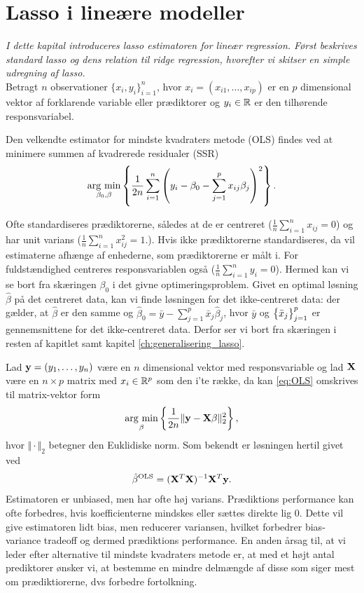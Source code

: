 \chapter{Lasso i lineære modeller}
\textit{I dette kapital introduceres lasso estimatoren for lineær regression. 
Først beskrives standard lasso og dens relation til ridge regression, hvorefter vi skitser en simple udregning af lasso.} \\[4mm]
%
Betragt \(n\) observationer \(\{x_i, y_i\}_{i=1}^n \), hvor $x_i=(x_{i1}, \ldots, x_{ip})$ er en $p$ dimensional vektor af forklarende variable eller prædiktorer og $y_i \in \mathbb{R}$ er den tilhørende responsvariabel.

Den velkendte estimator for mindste kvadraters metode (OLS) findes ved at minimere summen af kvadrerede residualer (SSR)
\begin{align}
\argmin_{\beta_0, \beta} \cbr{\frac{1}{2n} \sum_{i=1}^n \del{y_i - \beta_0 - \sum_{j=1}^p x_{ij} \beta_j}^2}. \label{eq:OLS}
\end{align}

Ofte standardiseres prædiktorerne, således at de er centreret (\(\frac{1}{n} \sum_{i=1}^n x_{ij} = 0\)) og har unit varians (\(\frac{1}{n} \sum_{i=1}^n x_{ij}^2=1\).).
Hvis ikke prædiktorerne standardiseres, da vil estimaterne afhænge af enhederne, som prædiktorerne er målt i.
For fuldstændighed centreres responsvariablen også (\(\frac{1}{n} \sum_{i=1}^n y_{i} = 0\)).
Hermed kan vi se bort fra skæringen $\beta_0$ i det givne optimeringsproblem.
Givet en optimal løsning \(\hat{\beta}\) på det centreret data, kan vi finde løsningen for det ikke-centreret data: der gælder, at \(\hat{\beta}\) er den samme og 
\(\hat{\beta}_0 = \bar{y} - \sum_{j=1}^p \bar{x}_j \hat{\beta}_j\), hvor \(\bar{y}\) og \(\cbr{\bar{x}_j}_{j=1}^p\) er gennemsnittene for det ikke-centreret data.
Derfor ser vi bort fra skæringen i resten af kapitlet samt kapitel \ref{ch:generalisering_lasso}.

Lad \(\mathbf{y}=(y_1, \ldots, y_n)\) være en \(n\) dimensional vektor med responsvariable og lad \(\mathbf{X}\) være en $n \times p$ matrix med $x_i \in \mathbb{R}^p$ som den i'te række, da kan \eqref{eq:OLS} omskrives til matrix-vektor form
\begin{align*}
\argmin_{ \beta} \cbr{\frac{1}{2n} \Vert \y - \X \beta \Vert_2^2},
\end{align*}
hvor \(\Vert \cdot \Vert_2\) betegner den Euklidiske norm.
Som bekendt er løsningen hertil givet ved
\begin{align*}
\hat{\beta}^{\text{OLS}} = (\mathbf{X}^T \mathbf{X})^{-1} \mathbf{X}^T \mathbf{y}.
\end{align*}
Estimatoren er unbiased, men har ofte høj varians. 
Prædiktions performance kan ofte forbedres, hvis koefficienterne mindskes eller sættes direkte lig 0.
Dette vil give estimatoren lidt bias, men reducerer variansen, hvilket forbedrer bias-variance tradeoff og dermed  prædiktions performance.
En anden årsag til, at vi leder efter alternative til mindste kvadraters metode er, at med et højt antal prediktorer ønsker vi, at bestemme en mindre delmængde af disse som siger mest om prædiktiorerne, dvs forbedre fortolkning.\\[4mm]

